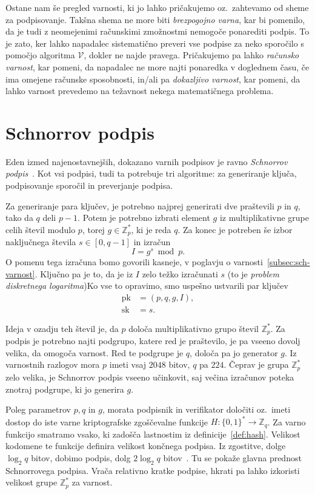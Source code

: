 \documentclass[isrm2, tisk]{fmfdelo}
\newcommand{\Z}{\mathbb Z}
\begin{document}
Ostane nam še pregled varnosti, ki jo lahko pričakujemo oz.\ zahtevamo od sheme za podpisovanje. 
Takšna shema ne more biti \textit{brezpogojno varna}, kar bi pomenilo, da je tudi z neomejenimi 
računskimi zmožnostmi nemogoče ponarediti podpis. To je zato, ker lahko napadalec sistematično 
preveri vse podpise za neko sporočilo s pomočjo algoritma $\mathcal{V}$, dokler ne najde pravega. 
Pričakujemo pa lahko \textit{računsko varnost}, kar pomeni, da napadalec ne more najti ponaredka 
v doglednem času, če ima omejene računske sposobnosti, in/ali pa \textit{dokazljivo varnost}, kar 
pomeni, da lahko varnost prevedemo na težavnost nekega matematičnega problema.

\section{Schnorrov podpis}
\label{sec:schnorr}
Eden izmed najenostavnejših, dokazano varnih podpisov je ravno \textit{Schnorrov podpis}~\cite{schnorr1989sig}.
Kot vsi podpisi, tudi ta potrebuje tri algoritme: za generiranje ključa, podpisovanje sporočil in preverjanje 
podpisa.

Za generiranje para ključev, je potrebno najprej generirati dve praštevili $p$ in $q$, tako da $q$ 
deli $p-1$. Potem je potrebno izbrati element $g$ iz multiplikativne grupe celih števil modulo $p$, torej 
$g \in \Z_p^*$, ki je reda $q$. Za konec je potreben še izbor naključnega števila $s \in [0, q - 1]$
in izračun 
$$ 
I = g^s \bmod p.
$$
O pomenu tega izračuna bomo govorili kasneje, v poglavju o varnosti~\ref{subsec:sch-varnost}. Ključno pa je to, 
da je iz $I$ zelo težko izračunati $s$ (to je \textit{problem diskretnega logaritma})Ko vse to opravimo, 
smo uspešno ustvarili par ključev
\begin{align*}
\text{pk} &= (p, q, g, I), \\
\text{sk} &= s.
\end{align*}

Ideja v ozadju teh števil je, da $p$ določa multiplikativno grupo števil $\Z_p^*$. Za podpis je 
potrebno najti podgrupo, katere red je praštevilo, je pa vseeno dovolj velika, da omogoča varnost. 
Red te podgrupe je $q$, določa pa jo generator $g$. Iz varnostnih razlogov mora $p$ imeti vsaj $2048$ 
bitov, $q$ pa $224$. Čeprav je grupa $\Z_p^*$ zelo velika, je Schnorrov podpis vseeno učinkovit, 
saj večina izračunov poteka znotraj podgrupe, ki jo generira $g$.

Poleg parametrov $p, q$ in $g$, morata podpisnik in verifikator določiti oz.\ imeti dostop do iste varne 
kriptografske zgoščevalne funkcije $H : \{0, 1\}^* \rightarrow \Z_q$. Za varno funkcijo smatramo vsako, 
ki zadošča lastnostim iz definicije~\ref{def:hash}. Velikost kodomene te funkcije definira velikost 
končnega podpisa. Iz zgostitve, dolge $\log_2 q$ bitov, dobimo podpis, dolg $2 \log_2 q$ bitov~\cite{
stinson2023crypto}. Tu se pokaže glavna prednost Schnorrovega podpisa. Vrača relativno kratke podpise, 
hkrati pa lahko izkoristi velikost grupe $\Z_p^*$ za varnost.
\end{document}
